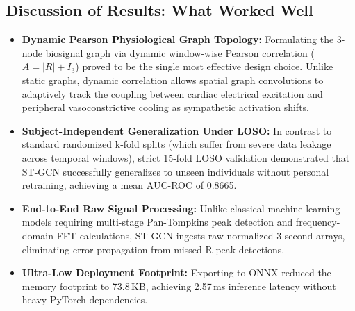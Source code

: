 \documentclass[11pt,a4paper]{article}
\begin{document}
\subsection{Discussion of Results: What Worked Well}
\begin{itemize}
    \item \textbf{Dynamic Pearson Physiological Graph Topology:} Formulating the 3-node biosignal graph via dynamic window-wise Pearson correlation ($A = |R| + I_3$) proved to be the single most effective design choice. Unlike static graphs, dynamic correlation allows spatial graph convolutions to adaptively track the coupling between cardiac electrical excitation and peripheral vasoconstrictive cooling as sympathetic activation shifts.
    \item \textbf{Subject-Independent Generalization Under LOSO:} In contrast to standard randomized k-fold splits (which suffer from severe data leakage across temporal windows), strict 15-fold LOSO validation demonstrated that ST-GCN successfully generalizes to unseen individuals without personal retraining, achieving a mean AUC-ROC of 0.8665.
    \item \textbf{End-to-End Raw Signal Processing:} Unlike classical machine learning models requiring multi-stage Pan-Tompkins peak detection and frequency-domain FFT calculations, ST-GCN ingests raw normalized 3-second arrays, eliminating error propagation from missed R-peak detections.
    \item \textbf{Ultra-Low Deployment Footprint:} Exporting to ONNX reduced the memory footprint to 73.8\,KB, achieving 2.57\,ms inference latency without heavy PyTorch dependencies.
\end{itemize}
\end{document}
